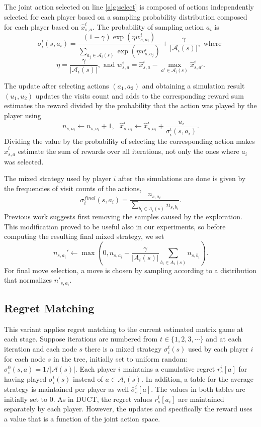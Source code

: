 \documentclass[conference]{IEEEtran}
\newcommand{\cA}{\mathcal{A}}
\begin{document}
The joint action selected on line \ref{alg:select} is composed of actions independently selected for each player 
based on a sampling probability distribution composed for each player based on $\hat{x}^i_{s,a}$. 
The probability of sampling action $a_i$ is
\begin{equation}
\label{eq:exp3select}
\sigma^t_i(s,a_i) = \frac{(1-\gamma) \exp(\eta w^i_{s,a_i})}{\sum_{a_j \in \cA_i(s)} \exp(\eta w^i_{s,a_j})} + \frac{\gamma}{|\cA_i(s)|}, \mbox{ where }
\end{equation}
\[ \eta = \frac{\gamma}{|\cA_i(s)|}, \mbox{ and } w^i_{s,a} = \hat{x}^i_{s,a} - \max_{a' \in \cA_i(s)} \hat{x}^i_{s,a'}. \]

The update after selecting actions $(a_1,a_2)$ and obtaining a simulation result $(u_1,u_2)$ updates the visits count 
and adds to the corresponding reward sum estimates the reward divided by the probability that the action was played by the player using
\[n_{s,a_i} \leftarrow n_{s,a_i} + 1, ~~~ \hat{x}^i_{s,a_i} \leftarrow \hat{x}^i_{s,a_i} + \frac{u_i}{\sigma^t_i(s,a_i)}.\]
Dividing the value by the probability of selecting the corresponding action makes $\hat{x}^i_{s,a}$ estimate the sum of rewards over all 
iterations, not only the ones where $a_i$ was selected. 

The mixed strategy used by player $i$ after the simulations are done is given by the frequencies of visit counts of the actions, 
\[\sigma^{final}_i(s,a_i) = \frac{n_{s,a_i}}{\sum_{b_i\in A_i(s)} n_{s,b_i}}.\]
Previous work \cite{Teytaud11Upper} suggests first removing the samples caused by the exploration. This modification proved to be useful also in our experiments, so before computing the resulting final mixed strategy, we set
\begin{equation}
n_{s,a_i}' \leftarrow \max\left(0,n_{s,a_i} - \frac{\gamma}{|A_i(s)|}\sum_{b_i\in A_i(s)}n_{s,b_i}\right).
\end{equation}
For final move selection, a move is chosen by sampling according to a distribution that normalizes $n'_{s,a_i}$. 

\subsection{Regret Matching}

This variant applies regret matching \cite{Hart00} to the current estimated matrix game at each stage. 
Suppose iterations are numbered from $t \in \{ 1, 2, 3, \cdots \}$ and at each iteration and each node $s$ 
there is a mixed strategy $\sigma_i^t(s)$ used by each player $i$ for each node $s$ in the tree, initially set to 
uniform random: $\sigma^0_i(s,a) = 1 / |\cA(s)|$. 
Each player $i$ maintains a cumulative regret $r^i_s[a]$ for having played $\sigma_i^t(s)$ instead of $a \in \cA_i(s)$. 
In addition, a table for the average strategy is maintained per player as well $\bar{\sigma}^i_s[a]$. The values in 
both tables are initially set to 0. 
As in DUCT, the regret values $r^i_s[a_i]$ are maintained separately by each player.
However, the updates and specifically the reward uses a value that is a function of the joint action space. 
\end{document}

